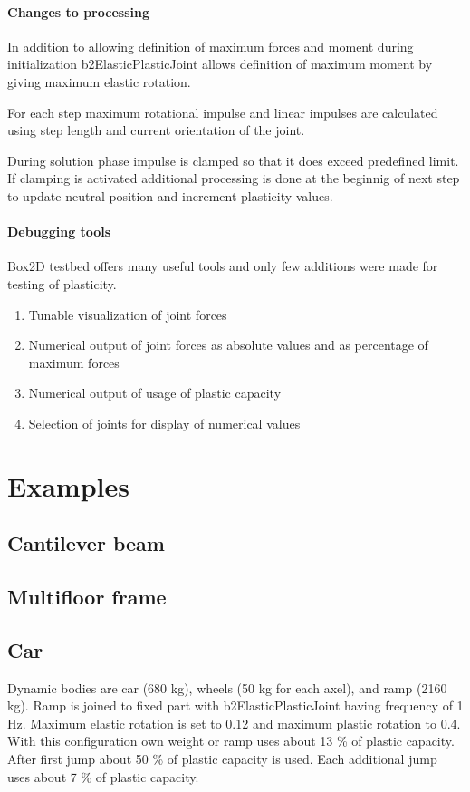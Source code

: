 \documentclass{jcgt}
\begin{document}
\paragraph{Changes to processing} 
In addition to allowing definition of maximum forces and moment during initialization 
b2ElasticPlasticJoint allows definition of maximum moment by giving maximum elastic rotation.

For each step maximum rotational impulse and linear impulses are calculated using step length and 
current orientation of the joint.

During solution phase impulse is clamped so that it does exceed predefined limit.
If clamping is activated additional processing is done at the beginnig of next step to update neutral position and
increment plasticity values.

\paragraph{Debugging tools} 
Box2D testbed offers many useful tools and only few additions were made for testing of plasticity.
\begin{enumerate}
\item Tunable visualization of joint forces
\item Numerical output of joint forces as absolute values and as percentage of maximum forces
\item Numerical output of usage of plastic capacity
\item Selection of joints for display of numerical values
\end{enumerate}

\section{Examples} 

\subsection{Cantilever beam} 

\subsection{Multifloor frame} 

\subsection{Car} 
Dynamic bodies are car (680 kg), wheels (50 kg for each axel), and ramp (2160 kg). 
Ramp is joined to fixed part with b2ElasticPlasticJoint having frequency of 1 Hz.
Maximum elastic rotation is set to 0.12 and maximum plastic rotation to 0.4.
With this configuration own weight or ramp uses about 13 \% of plastic capacity.
After first jump about 50 \% of  plastic capacity is used. Each additional jump uses about 
7 \% of plastic capacity.
\end{document}
